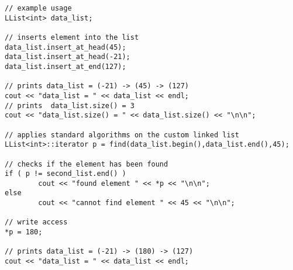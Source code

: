 \documentclass[10pt]{article}
\begin{document}
\begin{lstlisting}
// example usage
LList<int> data_list;

// inserts element into the list
data_list.insert_at_head(45);
data_list.insert_at_head(-21);
data_list.insert_at_end(127);

// prints data_list = (-21) -> (45) -> (127)
cout << "data_list = " << data_list << endl;
// prints  data_list.size() = 3
cout << "data_list.size() = " << data_list.size() << "\n\n";

// applies standard algorithms on the custom linked list
LList<int>::iterator p = find(data_list.begin(),data_list.end(),45);

// checks if the element has been found
if ( p != second_list.end() )
        cout << "found element " << *p << "\n\n";
else
        cout << "cannot find element " << 45 << "\n\n";

// write access
*p = 180;

// prints data_list = (-21) -> (180) -> (127)
cout << "data_list = " << data_list << endl;
\end{lstlisting}
%
%
\end{document}
